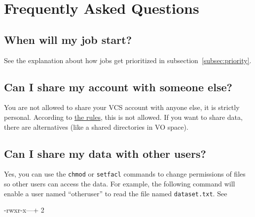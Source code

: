 \chapter{Frequently Asked Questions}
\label{ch:faq}

\ifgent
\section{When will my job start?}

See the explanation about how jobs get prioritized in subsection~\ref{subsec:priority}.

\fi
\section{Can I share my account with someone else?}

 You are not allowed to share your VCS account with anyone else, it is strictly personal.
\ifgent
According to \href{https://helpdesk.ugent.be/account/en/regels.php}{the rules},
this is not allowed.
\fi %
If you want to share data, there are alternatives (like a shared
directories in VO space).

\section{Can I share my data with other \hpc users?}

Yes, you can use the \verb|chmod| or \verb|setfacl| commands to change permissions
of files so other users can access the data. For example, the following command
will enable a user named ``otheruser'' to read the file named \verb|dataset.txt|.
See

\begin{prompt}
-rwxr-x---+ 2 %
\end{prompt}


